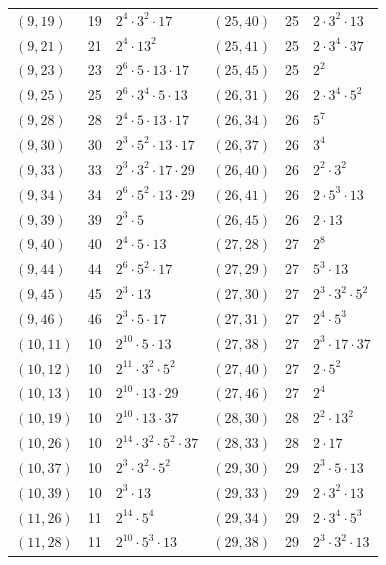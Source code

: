 \documentclass[11pt]{article}
\begin{document}
\begin{longtable}{@{}lrl@{\qquad}lrl@{}}
$(9,19)$ & 19 & $2^{4}\cdot 3^{2}\cdot 17$ & $(25,40)$ & 25 & $2\cdot 3^{2}\cdot 13$\\
$(9,21)$ & 21 & $2^{4}\cdot 13^{2}$ & $(25,41)$ & 25 & $2\cdot 3^{4}\cdot 37$\\
$(9,23)$ & 23 & $2^{6}\cdot 5\cdot 13\cdot 17$ & $(25,45)$ & 25 & $2^{2}$\\
$(9,25)$ & 25 & $2^{6}\cdot 3^{4}\cdot 5\cdot 13$ & $(26,31)$ & 26 & $2\cdot 3^{4}\cdot 5^{2}$\\
$(9,28)$ & 28 & $2^{4}\cdot 5\cdot 13\cdot 17$ & $(26,34)$ & 26 & $5^{7}$\\
$(9,30)$ & 30 & $2^{3}\cdot 5^{2}\cdot 13\cdot 17$ & $(26,37)$ & 26 & $3^{4}$\\
$(9,33)$ & 33 & $2^{3}\cdot 3^{2}\cdot 17\cdot 29$ & $(26,40)$ & 26 & $2^{2}\cdot 3^{2}$\\
$(9,34)$ & 34 & $2^{6}\cdot 5^{2}\cdot 13\cdot 29$ & $(26,41)$ & 26 & $2\cdot 5^{3}\cdot 13$\\
$(9,39)$ & 39 & $2^{3}\cdot 5$ & $(26,45)$ & 26 & $2\cdot 13$\\
$(9,40)$ & 40 & $2^{4}\cdot 5\cdot 13$ & $(27,28)$ & 27 & $2^{8}$\\
$(9,44)$ & 44 & $2^{6}\cdot 5^{2}\cdot 17$ & $(27,29)$ & 27 & $5^{3}\cdot 13$\\
$(9,45)$ & 45 & $2^{3}\cdot 13$ & $(27,30)$ & 27 & $2^{3}\cdot 3^{2}\cdot 5^{2}$\\
$(9,46)$ & 46 & $2^{3}\cdot 5\cdot 17$ & $(27,31)$ & 27 & $2^{4}\cdot 5^{3}$\\
$(10,11)$ & 10 & $2^{10}\cdot 5\cdot 13$ & $(27,38)$ & 27 & $2^{3}\cdot 17\cdot 37$\\
$(10,12)$ & 10 & $2^{11}\cdot 3^{2}\cdot 5^{2}$ & $(27,40)$ & 27 & $2\cdot 5^{2}$\\
$(10,13)$ & 10 & $2^{10}\cdot 13\cdot 29$ & $(27,46)$ & 27 & $2^{4}$\\
$(10,19)$ & 10 & $2^{10}\cdot 13\cdot 37$ & $(28,30)$ & 28 & $2^{2}\cdot 13^{2}$\\
$(10,26)$ & 10 & $2^{14}\cdot 3^{2}\cdot 5^{2}\cdot 37$ & $(28,33)$ & 28 & $2\cdot 17$\\
$(10,37)$ & 10 & $2^{3}\cdot 3^{2}\cdot 5^{2}$ & $(29,30)$ & 29 & $2^{3}\cdot 5\cdot 13$\\
$(10,39)$ & 10 & $2^{3}\cdot 13$ & $(29,33)$ & 29 & $2\cdot 3^{2}\cdot 13$\\
$(11,26)$ & 11 & $2^{14}\cdot 5^{4}$ & $(29,34)$ & 29 & $2\cdot 3^{4}\cdot 5^{3}$\\
$(11,28)$ & 11 & $2^{10}\cdot 5^{3}\cdot 13$ & $(29,38)$ & 29 & $2^{3}\cdot 3^{2}\cdot 13$\\

\end{longtable}
\end{document}
